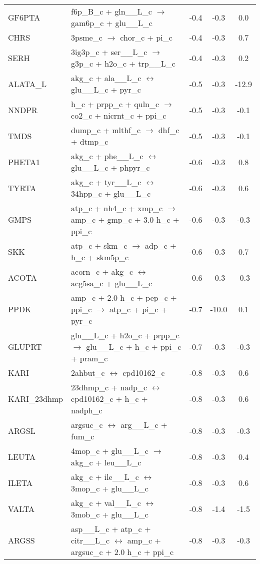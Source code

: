 \begin{longtable}{lp{}ccc}
GF6PTA	&	f6p\_B\_c + gln\_\_L\_c $\rightarrow$ gam6p\_c + glu\_\_L\_c	&	-0.4	&	-0.3	&	0.0	\\
CHRS	&	3psme\_c $\rightarrow$ chor\_c + pi\_c	&	-0.4	&	-0.3	&	0.7	\\
SERH	&	3ig3p\_c + ser\_\_L\_c $\rightarrow$ g3p\_c + h2o\_c + trp\_\_L\_c	&	-0.4	&	-0.3	&	0.2	\\
ALATA\_L	&	akg\_c + ala\_\_L\_c $\leftrightarrow$ glu\_\_L\_c + pyr\_c	&	-0.5	&	-0.3	&	-12.9	\\
NNDPR	&	h\_c + prpp\_c + quln\_c $\rightarrow$ co2\_c + nicrnt\_c + ppi\_c	&	-0.5	&	-0.3	&	-0.1	\\
TMDS	&	dump\_c + mlthf\_c $\rightarrow$ dhf\_c + dtmp\_c	&	-0.5	&	-0.3	&	-0.1	\\
PHETA1	&	akg\_c + phe\_\_L\_c $\leftrightarrow$ glu\_\_L\_c + phpyr\_c	&	-0.6	&	-0.3	&	0.8	\\
TYRTA	&	akg\_c + tyr\_\_L\_c $\leftrightarrow$ 34hpp\_c + glu\_\_L\_c	&	-0.6	&	-0.3	&	0.6	\\
GMPS	&	atp\_c + nh4\_c + xmp\_c $\rightarrow$ amp\_c + gmp\_c + 3.0 h\_c + ppi\_c	&	-0.6	&	-0.3	&	-0.3	\\
SKK	&	atp\_c + skm\_c $\rightarrow$ adp\_c + h\_c + skm5p\_c	&	-0.6	&	-0.3	&	0.7	\\
ACOTA	&	acorn\_c + akg\_c $\leftrightarrow$ acg5sa\_c + glu\_\_L\_c	&	-0.6	&	-0.3	&	-0.3	\\
PPDK	&	amp\_c + 2.0 h\_c + pep\_c + ppi\_c $\rightarrow$ atp\_c + pi\_c + pyr\_c	&	-0.7	&	-10.0	&	0.1	\\
GLUPRT	&	gln\_\_L\_c + h2o\_c + prpp\_c $\rightarrow$ glu\_\_L\_c + h\_c + ppi\_c + pram\_c	&	-0.7	&	-0.3	&	-0.3	\\
KARI	&	2ahbut\_c $\leftrightarrow$ cpd10162\_c	&	-0.8	&	-0.3	&	0.6	\\
KARI\_23dhmp	&	23dhmp\_c + nadp\_c $\leftrightarrow$ cpd10162\_c + h\_c + nadph\_c	&	-0.8	&	-0.3	&	0.6	\\
ARGSL	&	argsuc\_c $\leftrightarrow$ arg\_\_L\_c + fum\_c	&	-0.8	&	-0.3	&	-0.3	\\
LEUTA	&	4mop\_c + glu\_\_L\_c $\rightarrow$ akg\_c + leu\_\_L\_c	&	-0.8	&	-0.3	&	0.4	\\
ILETA	&	akg\_c + ile\_\_L\_c $\leftrightarrow$ 3mop\_c + glu\_\_L\_c	&	-0.8	&	-0.3	&	0.6	\\
VALTA	&	akg\_c + val\_\_L\_c $\leftrightarrow$ 3mob\_c + glu\_\_L\_c	&	-0.8	&	-1.4	&	-1.5	\\
ARGSS	&	asp\_\_L\_c + atp\_c + citr\_\_L\_c $\leftrightarrow$ amp\_c + argsuc\_c + 2.0 h\_c + ppi\_c	&	-0.8	&	-0.3	&	-0.3	\\

\end{longtable}
